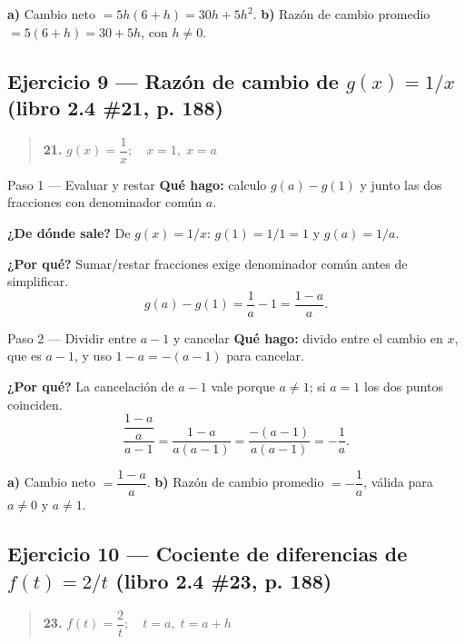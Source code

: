 \documentclass[11pt]{article}
\begin{document}
\begin{resp}
\textbf{a)} Cambio neto $=5h(6+h)=30h+5h^2$. \qquad \textbf{b)} Razón de cambio promedio $=5(6+h)=30+5h$, con $h\neq 0$.
\end{resp}

\subsection*{Ejercicio 9 — Razón de cambio de $g(x)=1/x$ (libro 2.4 \#21, p. 188)}

\begin{quote}
\textbf{21.} $g(x)=\dfrac{1}{x};\quad x=1,\;x=a$
\end{quote}

\begin{paso}{Paso 1 --- Evaluar y restar}
\textbf{Qué hago:} calculo $g(a)-g(1)$ y junto las dos fracciones con denominador común $a$.

\textbf{¿De dónde sale?} De $g(x)=1/x$: $g(1)=1/1=1$ y $g(a)=1/a$.

\textbf{¿Por qué?} Sumar/restar fracciones exige denominador común antes de simplificar.
\[
g(a)-g(1)=\frac{1}{a}-1=\frac{1-a}{a}.
\]
\end{paso}

\begin{paso}{Paso 2 --- Dividir entre $a-1$ y cancelar}
\textbf{Qué hago:} divido entre el cambio en $x$, que es $a-1$, y uso $1-a=-(a-1)$ para cancelar.

\textbf{¿Por qué?} La cancelación de $a-1$ vale porque $a\neq 1$; si $a=1$ los dos puntos coinciden.
\[
\frac{\dfrac{1-a}{a}}{a-1}=\frac{1-a}{a(a-1)}=\frac{-(a-1)}{a(a-1)}=-\frac{1}{a}.
\]
\end{paso}

\begin{resp}
\textbf{a)} Cambio neto $=\dfrac{1-a}{a}$. \qquad \textbf{b)} Razón de cambio promedio $=-\dfrac{1}{a}$, válida para $a\neq 0$ y $a\neq 1$.
\end{resp}

\subsection*{Ejercicio 10 — Cociente de diferencias de $f(t)=2/t$ (libro 2.4 \#23, p. 188)}

\begin{quote}
\textbf{23.} $f(t)=\dfrac{2}{t};\quad t=a,\;t=a+h$
\end{quote}
\end{document}
